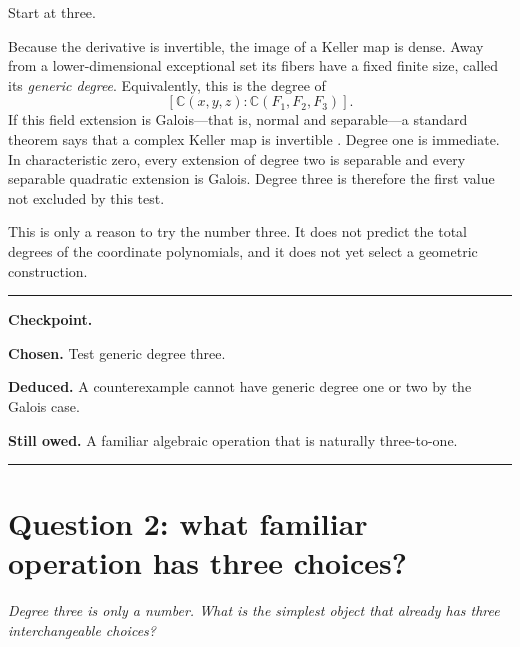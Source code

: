 \documentclass[11pt,a4paper]{article}
\numberwithin{equation}{section}
\theoremstyle{definition}
\theoremstyle{remark}
\newcommand{\C}{\mathbb C}
\newenvironment{userquestion}
  {\par\medskip\noindent{\color{userblue}\bfseries USER}\quad
   \begin{minipage}[t]{0.84\linewidth}\itshape}
  {\end{minipage}\par\medskip}
\newenvironment{modelanswer}
  {\par\smallskip\noindent{\color{modelgreen}\bfseries MODEL}\par\smallskip}
  {\par\medskip}
\newenvironment{checkpoint}
  {\par\smallskip\noindent\color{paperblue}\hrule\color{black}
   \vspace{0.55em}\noindent\begin{minipage}{\linewidth}\small
   \textbf{Checkpoint.}\par\smallskip}
  {\end{minipage}\vspace{0.45em}\color{paperblue}\hrule\color{black}
   \par\medskip}
\newcommand{\chosen}[1]{\textbf{Chosen.} #1\par\smallskip}
\newcommand{\deduced}[1]{\textbf{Deduced.} #1\par\smallskip}
\newcommand{\owed}[1]{\textbf{Still owed.} #1}
\begin{document}
\begin{modelanswer}
Start at three.

Because the derivative is invertible, the image of a Keller map is dense.
Away from a lower-dimensional exceptional set its fibers have a fixed finite
size, called its \emph{generic degree}.  Equivalently, this is the degree of
\[
  [\C(x,y,z):\C(F_1,F_2,F_3)].
\]
If this field extension is Galois---that is, normal and separable---a standard
theorem says that a complex Keller map is invertible
\cite{Campbell,Razar,Wright}.  Degree one is immediate.  In characteristic
zero, every extension of degree two is separable and every separable
quadratic extension is Galois.  Degree three is therefore the first value not
excluded by this test.

This is only a reason to try the number three.  It does not predict the total
degrees of the coordinate polynomials, and it does not yet select a geometric
construction.
\end{modelanswer}

\begin{checkpoint}
\chosen{Test generic degree three.}
\deduced{A counterexample cannot have generic degree one or two by the Galois
case.}
\owed{A familiar algebraic operation that is naturally three-to-one.}
\end{checkpoint}

\section{Question 2: what familiar operation has three choices?}

\begin{userquestion}
Degree three is only a number.  What is the simplest object that already has
three interchangeable choices?
\end{userquestion}
\end{document}
